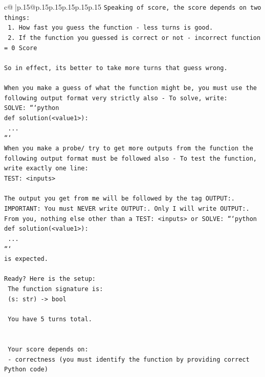 \documentclass{article}
\begin{document}
{\begin{supertabular}{c@{$\;$}|p{.15\linewidth}@{}p{.15\linewidth}p{.15\linewidth}p{.15\linewidth}p{.15\linewidth}p{.15\linewidth}}
{{{\texttt{Speaking of score, the score depends on two things:} \\
\texttt{    1. How fast you guess the function {-} less turns is good.} \\
\texttt{    2. If the function you guessed is correct or not {-} incorrect function = 0 Score} \\
\\ 
\texttt{So in effect, its better to take more turns that guess wrong.} \\
\\ 
\texttt{When you make a guess of what the function might be, you must use the following output format very strictly also {-} To solve, write:} \\
\texttt{SOLVE: ```python} \\
\texttt{def solution(<value1>):} \\
\texttt{    ...} \\
\texttt{```} \\
\texttt{When you make a probe/ try to get more outputs from the function the following output format must be followed also {-} To test the function, write exactly one line:} \\
\texttt{TEST: <inputs>} \\
\\ 
\texttt{The output you get from me will be followed by the tag OUTPUT:.} \\
\texttt{IMPORTANT: You must NEVER write OUTPUT:. Only I will write OUTPUT:.} \\
\texttt{From you, nothing else other than a TEST: <inputs> or SOLVE: ```python} \\
\texttt{def solution(<value1>):} \\
\texttt{    ...} \\
\texttt{```} \\
\texttt{is expected.} \\
\\ 
\texttt{Ready? Here is the setup:} \\
\texttt{	The function signature is:} \\
\texttt{	(s: str) {-}> bool} \\
\\ 
\texttt{	You have 5 turns total.} \\
\\ 
\\ 
\texttt{	Your score depends on:} \\
\texttt{		{-} correctness (you must identify the function by providing correct Python code)} \\
}}}
\end{supertabular}}
\end{document}

